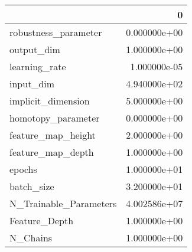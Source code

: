 \begin{tabular}{lr}
\toprule
{} &             0 \\
\midrule
robustness\_parameter   &  0.000000e+00 \\
output\_dim             &  1.000000e+00 \\
learning\_rate          &  1.000000e-05 \\
input\_dim              &  4.940000e+02 \\
implicit\_dimension     &  5.000000e+00 \\
homotopy\_parameter     &  0.000000e+00 \\
feature\_map\_height     &  2.000000e+00 \\
feature\_map\_depth      &  1.000000e+00 \\
epochs                 &  1.000000e+01 \\
batch\_size             &  3.200000e+01 \\
N\_Trainable\_Parameters &  4.002586e+07 \\
Feature\_Depth          &  1.000000e+00 \\
N\_Chains               &  1.000000e+00 \\
\bottomrule
\end{tabular}

